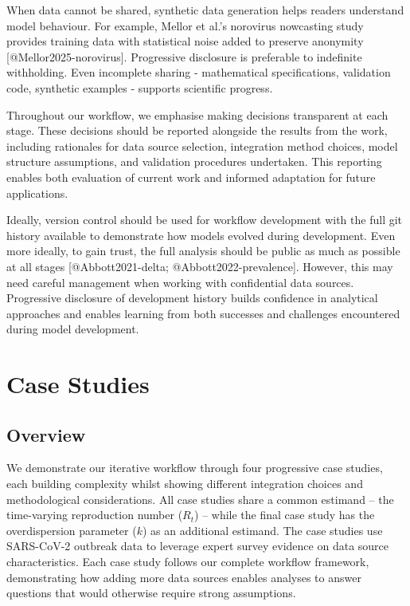 \documentclass{article}
\begin{document}
When data cannot be shared, synthetic data generation helps readers understand model behaviour.
For example, Mellor et al.'s norovirus nowcasting study provides training data with statistical noise added to preserve anonymity [@Mellor2025-norovirus].
Progressive disclosure is preferable to indefinite withholding.
Even incomplete sharing - mathematical specifications, validation code, synthetic examples - supports scientific progress.

Throughout our workflow, we emphasise making decisions transparent at each stage.
These decisions should be reported alongside the results from the work, including rationales for data source selection, integration method choices, model structure assumptions, and validation procedures undertaken.
This reporting enables both evaluation of current work and informed adaptation for future applications.

Ideally, version control should be used for workflow development with the full git history available to demonstrate how models evolved during development.
Even more ideally, to gain trust, the full analysis should be public as much as possible at all stages [@Abbott2021-delta; @Abbott2022-prevalence].
However, this may need careful management when working with confidential data sources.
Progressive disclosure of development history builds confidence in analytical approaches and enables learning from both successes and challenges encountered during model development.

\section{Case Studies}

\subsection{Overview}

We demonstrate our iterative workflow through four progressive case studies, each building complexity whilst showing different integration choices and methodological considerations.
All case studies share a common estimand -- the time-varying reproduction number ($R_t$) -- while the final case study has the overdispersion parameter ($k$) as an additional estimand. The case studies use SARS-CoV-2 outbreak data to leverage expert survey evidence on data source characteristics.
Each case study follows our complete workflow framework, demonstrating how adding more data sources enables analyses to answer questions that would otherwise require strong assumptions.
\end{document}
